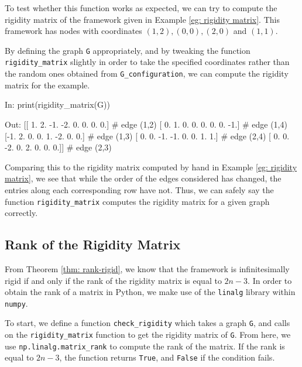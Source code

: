 \begin{flushleft}
To test whether this function works as expected, we can try to compute the rigidity matrix of the framework given in Example \ref{eg: rigidity matrix}. This framework has nodes with coordinates $(1,2), (0,0), (2,0)$ and $(1,1)$. 
\end{flushleft}

\begin{flushleft}
By defining the graph \texttt{G} appropriately, and by tweaking the function \texttt{rigidity\_matrix} slightly in order to take the specified coordinates rather than the random ones obtained from \texttt{G\_configuration}, we can compute the rigidity matrix for the example.
\end{flushleft}

\begin{code}
    In: print(rigidity_matrix(G))

    Out: [[ 1.  2. -1. -2.  0.  0.  0.  0.]    # edge (1,2)
          [ 0.  1.  0.  0.  0.  0.  0. -1.]    # edge (1,4)
          [-1.  2.  0.  0.  1. -2.  0.  0.]    # edge (1,3)
          [ 0.  0. -1. -1.  0.  0.  1.  1.]    # edge (2,4)
          [ 0.  0. -2.  0.  2.  0.  0.  0.]]   # edge (2,3)
\end{code}    

\begin{flushleft}
Comparing this to the rigidity matrix computed by hand in Example \ref{eg: rigidity matrix}, we see that while the order of the edges considered has changed, the entries along each corresponding row have not. Thus, we can safely say the function \texttt{rigidity\_matrix} computes the rigidity matrix for a given graph correctly.
\end{flushleft}

\subsection{Rank of the Rigidity Matrix}

\begin{flushleft}
From Theorem \ref{thm: rank-rigid}, we know that the framework is infinitesimally rigid if and only if the rank of the rigidity matrix is equal to $2n-3$. In order to obtain the rank of a matrix in Python, we make use of the \texttt{linalg} library within \texttt{numpy}. 
\end{flushleft}

\begin{flushleft}
To start, we define a function \texttt{check\_rigidity} which takes a graph \texttt{G}, and calls on the \texttt{rigidity\_matrix} function to get the rigidity matrix of \texttt{G}. From here, we use \texttt{np.linalg.matrix\_rank} to compute the rank of the matrix. If the rank is equal to $2n-3$, the function returns \texttt{True}, and \texttt{False} if the condition fails.
\end{flushleft}

